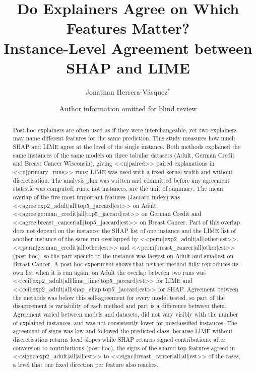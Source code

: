 \documentclass{cys}
\title{Do Explainers Agree on Which Features Matter? \\ Instance-Level Agreement between SHAP and LIME}
\author{Jonathan Herrera-V\'asquez$^{*}$}
\affil{
Universidad Americana de Europa (UNADE), Department of Computer Science, Canc\'un, \authorcr
Mexico
\authorcr \authorcr
jonnabio@gmail.com
\authorcr \authorcr
}
\author{Author information omitted for blind review}
\affil{\authorcr}
\begin{document}
\maketitle

\renewcommand{\tablename}{Table}

\begin{abstract}
Post-hoc explainers are often used as if they were interchangeable, yet two explainers may
name different features for the same prediction. This study measures how much SHAP and LIME
agree at the level of the single instance. Both methods explained the same instances of
the same models on three tabular datasets (Adult, German Credit and Breast Cancer
Wisconsin), giving <<n|paired>> paired explanations in <<n|primary_runs>> runs; LIME was
used with a fixed kernel width and without discretisation. The
analysis plan was written and committed before any agreement statistic was computed; runs,
not instances, are the unit of summary. The mean overlap of the five most important
features (Jaccard index) was <<agree|exp2_adult|all|top5_jaccard|est>> on Adult,
<<agree|german_credit|all|top5_jaccard|est>> on German Credit and
<<agree|breast_cancer|all|top5_jaccard|est>> on Breast Cancer. Part of this overlap does
not depend on the instance: the SHAP list of one instance and the LIME list of another
instance of the same run overlapped by <<perm|exp2_adult|all|other|est>>,
<<perm|german_credit|all|other|est>> and <<perm|breast_cancer|all|other|est>> (post hoc), so
the part specific to the instance was largest on Adult and smallest on Breast Cancer. A
post hoc experiment shows that neither method fully reproduces its own list when it is run again: on Adult the
overlap between two runs was <<ceil|exp2_adult|all|lime_lime|top5_jaccard|est>> for LIME
and <<ceil|exp2_adult|all|shap_shap|top5_jaccard|est>> for SHAP. Agreement between the methods was below this self-agreement for every model tested, so part of the disagreement is
variability of each method and part is a difference between them. Agreement varied between
models and datasets, did not vary visibly with the number of explained instances, and was
not consistently lower for misclassified instances. The agreement of signs was low and
followed the predicted class, because LIME without discretisation returns local slopes
while SHAP returns signed contributions; after conversion to contributions (post hoc), the
signs of the shared top features agreed in <<signc|exp2_adult|all|all|est>> to
<<signc|breast_cancer|all|all|est>> of the cases, a level that one fixed direction per
feature also reaches.
\end{abstract}
\end{document}
